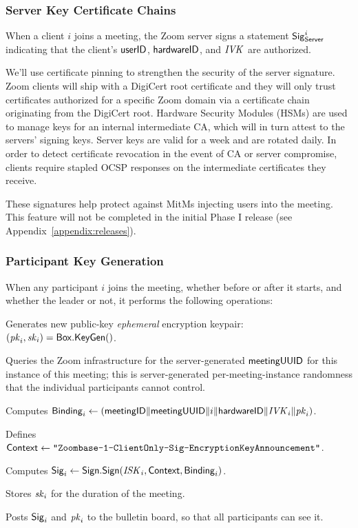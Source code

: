 \subsubsection{Server Key Certificate Chains}
\label{subsubsec:servercert}

When a client $i$ joins a meeting, the Zoom server signs a statement
${\sf Sig}^i_{\mathsf{Server}}$ indicating that the client's $\mathsf{userID}$, ${\sf hardwareID}$,
and $\mathit{IVK}$ are authorized.

We'll use certificate pinning to strengthen the security of the server signature. Zoom clients will ship with a DigiCert root certificate and they will only trust certificates authorized for a specific Zoom domain via a certificate chain originating from the DigiCert root. Hardware Security Modules (HSMs) are used to manage keys for an internal intermediate CA, which will in turn attest to the servers' signing keys. Server keys are valid for a week and are rotated daily. In order to detect certificate revocation in the event of CA or server compromise, clients require stapled OCSP responses on the intermediate certificates they receive.

These signatures help protect against MitMs injecting users into the meeting. This feature will not be completed in the initial Phase I release (see Appendix~\ref{appendix:releases}).

\subsubsection{Participant Key Generation}
\label{subsubsec:partikeygen}
When any participant $i$ joins the meeting, whether before or after it starts, and whether the leader or not, it performs the following operations:

\begingroup
\RaggedRight
\begin{enumerate*}
\item Generates new public-key \textit{ephemeral} encryption keypair: $(\mathit{pk}_i, \mathit{sk}_i) = {\sf Box}.\mathsf{KeyGen}()$.
\item Queries the Zoom infrastructure for the server-generated ${\sf meetingUUID}$ for this instance of this meeting; this is server-generated per-meeting-instance randomness that the individual participants cannot control.
\item Computes ${\sf Binding}_i \leftarrow \left( {\sf meetingID} \| \allowbreak {\sf meetingUUID} \| i \allowbreak \| {\sf hardwareID} \| \mathit{IVK}_i \| \allowbreak \mathit{pk}_i \right)$.
\item Defines ${\sf Context} \leftarrow \texttt{"Zoombase-1-ClientOnly-Sig-EncryptionKeyAnnouncement"}$.
\item Computes ${\sf Sig}_i \leftarrow {\sf Sign}.\mathsf{Sign}(\mathit{ISK}_i, {\sf Context}, {\sf Binding}_i)$.
\item Stores $\mathit{sk}_i$ for the duration of the meeting.
\item Posts ${\sf Sig}_i$ and $\mathit{pk}_i$ to the bulletin board, so that all participants can see it.
\end{enumerate*}
\endgroup

